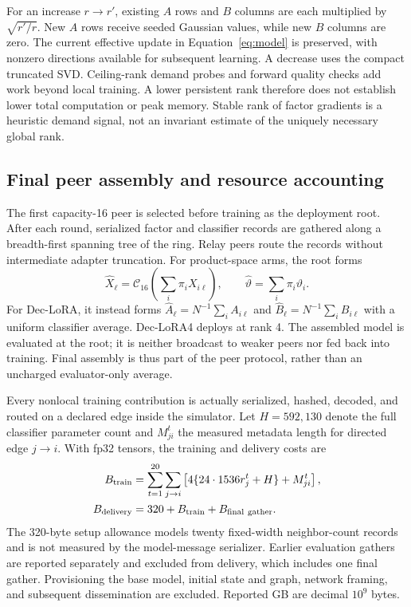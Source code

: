 \documentclass[11pt]{article}
\begin{document}
For an increase $r\to r'$, existing $A$ rows and $B$ columns are each multiplied by $\sqrt{r'/r}$. New $A$ rows receive seeded Gaussian values, while new $B$ columns are zero. The current effective update in Equation~\eqref{eq:model} is preserved, with nonzero directions available for subsequent learning. A decrease uses the compact truncated SVD. Ceiling-rank demand probes and forward quality checks add work beyond local training. A lower persistent rank therefore does not establish lower total computation or peak memory. Stable rank of factor gradients is a heuristic demand signal, not an invariant estimate of the uniquely necessary global rank.

\subsection{Final peer assembly and resource accounting}
The first capacity-16 peer is selected before training as the deployment root. After each round, serialized factor and classifier records are gathered along a breadth-first spanning tree of the ring. Relay peers route the records without intermediate adapter truncation. For product-space arms, the root forms
\begin{equation}
 \widehat X_\ell=\mathcal C_{16}\left(\sum_i\pi_iX_{i\ell}\right),\qquad
 \widehat\vartheta=\sum_i\pi_i\vartheta_i.
 \label{eq:assembly}
\end{equation}
For Dec-LoRA, it instead forms $\widehat A_\ell=N^{-1}\sum_iA_{i\ell}$ and $\widehat B_\ell=N^{-1}\sum_iB_{i\ell}$ with a uniform classifier average. Dec-LoRA4 deploys at rank 4. The assembled model is evaluated at the root; it is neither broadcast to weaker peers nor fed back into training. Final assembly is thus part of the peer protocol, rather than an uncharged evaluator-only average.

Every nonlocal training contribution is actually serialized, hashed, decoded, and routed on a declared edge inside the simulator. Let $H=592{,}130$ denote the full classifier parameter count and $M_{ji}^t$ the measured metadata length for directed edge $j\to i$. With fp32 tensors, the training and delivery costs are
\begin{align}
 B_{\rm train}&=\sum_{t=1}^{20}\sum_{j\to i}\left[4\{24\cdot1536r_j^t+H\}+M_{ji}^t\right],\\
 B_{\rm delivery}&=320+B_{\rm train}+B_{\rm final\ gather}.
 \label{eq:bytes}
\end{align}
The 320-byte setup allowance models twenty fixed-width neighbor-count records and is not measured by the model-message serializer. Earlier evaluation gathers are reported separately and excluded from delivery, which includes one final gather. Provisioning the base model, initial state and graph, network framing, and subsequent dissemination are excluded. Reported GB are decimal $10^9$ bytes.
\end{document}
